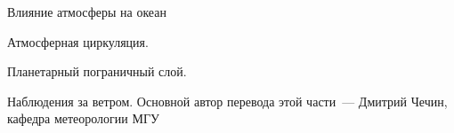 \begin{chapter}{Влияние атмосферы на океан}
\begin{section}{Атмосферная циркуляция.}
\end{section}  

\begin{section}{Планетарный пограничный слой.}


\end{section}

\begin{section}{Наблюдения за ветром.}
Основной автор перевода этой части~--- Дмитрий Чечин, кафедра метеорологии МГУ


\end{section}
\end{chapter}
